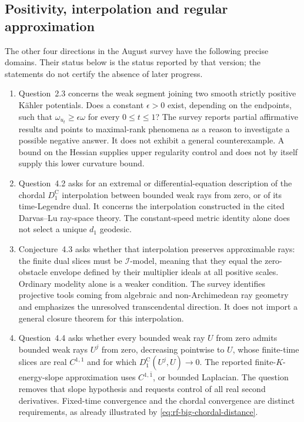 \subsection{Positivity, interpolation and regular approximation}

The other four directions in the August survey have the following
precise domains. Their status below is the status reported by that
version; the statements do not certify the absence of later progress.

\begin{enumerate}
\item Question~2.3 concerns the weak segment joining two smooth
strictly positive K\"ahler potentials. Does a constant $\epsilon>0$
exist, depending on the endpoints, such that
$\omega_{u_t}\geq\epsilon\omega$ for every $0\leq t\leq1$?
The survey reports partial affirmative results and points to
maximal-rank phenomena as a reason to investigate a possible
negative answer. It does not exhibit a general counterexample.
A bound on the Hessian supplies upper regularity control and
does not by itself supply this lower curvature bound.

\item Question~4.2 asks for an extremal or differential-equation
description of the chordal $D_1^{\mathrm C}$ interpolation
between bounded weak rays from zero, or of its time-Legendre
dual. It concerns the interpolation constructed in the cited
Darvas--Lu ray-space theory. The constant-speed metric identity
alone does not select a unique $d_1$ geodesic.

\item Conjecture~4.3 asks whether that interpolation preserves
approximable rays: the finite dual slices must be
$\mathcal I$-model, meaning that they equal the zero-obstacle
envelope defined by their multiplier ideals at all positive
scales. Ordinary modelity alone is a weaker condition.
The survey identifies projective tools coming from algebraic
and non-Archimedean ray geometry and emphasizes the unresolved
transcendental direction. It does not import a general closure
theorem for this interpolation.

\item Question~4.4 asks whether every bounded weak ray $U$ from
zero admits bounded weak rays $U^j$ from zero, decreasing
pointwise to $U$, whose finite-time slices are real $C^{1,1}$
and for which $D_1^{\mathrm C}(U^j,U)\to0$.
The reported finite-$K$-energy-slope approximation uses
$C^{1,\bar1}$, or bounded Laplacian. The question removes
that slope hypothesis and requests control of all real second
derivatives. Fixed-time convergence and the chordal convergence
are distinct requirements, as already illustrated by
\eqref{eq:rf-big-chordal-distance}.
\end{enumerate}

